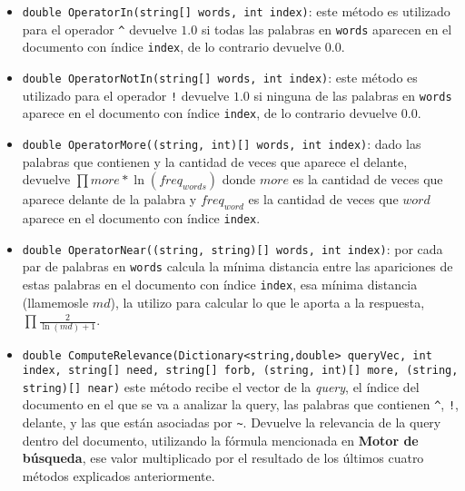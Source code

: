 \documentclass{report}
\begin{document}
\begin{itemize}
	\item {\tt double OperatorIn(string[] words, int index)}: este m\'etodo es utilizado para el operador {\tt \^{}} devuelve $1.0$ si todas las palabras en {\tt words} 
	aparecen en el documento con \'indice {\tt index}, de lo contrario devuelve $0.0$.
	\item {\tt double OperatorNotIn(string[] words, int index)}: este m\'etodo es utilizado para el operador {\tt !} devuelve $1.0$ si ninguna de las palabras en {\tt words} 
	aparece en el documento con \'indice {\tt index}, de lo contrario devuelve $0.0$.
	\item {\tt double OperatorMore((string, int)[] words, int index)}: dado las palabras que contienen {\tt *} y la cantidad de veces que aparece el {\tt *} delante, devuelve $\prod more * \ln(freq_{words})$ donde $more$ es la cantidad de veces que {\tt *} aparece delante de la palabra y $freq_{word}$ es la cantidad de veces que $word$ aparece en el documento con \'indice {\tt index}.
	\item {\tt double OperatorNear((string, string)[] words, int index)}: por cada par de palabras en {\tt words} calcula la m\'inima distancia entre las apariciones de estas palabras en el documento con \'indice {\tt index}, esa m\'inima distancia (llamemosle $md$), la utilizo para calcular lo que le aporta a la respuesta, $\prod \frac{2}{\ln(md) + 1}$.
	\item {\tt double ComputeRelevance(Dictionary<string,double> queryVec, int index, string[] need, string[] forb, (string, int)[] more, (string, string)[] near)} este m\'etodo recibe el vector de la {\it query}, el \'indice del documento en el que se va a analizar la query, las palabras que contienen {\tt \^{}}, {\tt !}, {\tt *} delante, y las que est\'an asociadas por {\tt \~{}}. Devuelve la relevancia de la query dentro del documento, utilizando la f\'ormula mencionada en {\bf Motor de b\'usqueda}, ese valor multiplicado por el resultado de los \'ultimos cuatro m\'etodos explicados anteriormente.
\end{itemize}
\end{document}
